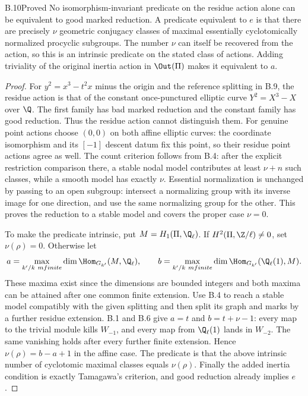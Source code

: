 \begin{claim}{B.10}{Proved}
No isomorphism-invariant predicate on the residue action alone can be
equivalent to good marked reduction. A predicate equivalent to $e$ is that
there are precisely $\nu$ geometric conjugacy classes of maximal
essentially cyclotomically normalized procyclic subgroups. The number $\nu$
can itself be recovered from the action, so this is an intrinsic predicate
on the stated class of actions. Adding triviality
of the original inertia action in $\Out(\Pi)$ makes it equivalent to $a$.
\end{claim}
\begin{proof}
For $y^2=x^3-t^2x$ minus the origin and the reference splitting in B.9,
the residue action is that of the constant once-punctured elliptic curve
$Y^2=X^3-X$ over $\Q$. The first family has bad marked reduction and the
constant family has good reduction. Thus the residue action cannot
distinguish them. For genuine point actions choose $(0,0)$ on both affine
elliptic curves: the coordinate isomorphism and its $[-1]$ descent datum
fix this point, so their residue point actions agree as well.
The count criterion follows from B.4: after the explicit restriction
comparison there, a stable nodal model contributes at least $\nu+n$ such
classes, while a smooth model has exactly $\nu$. Essential normalization
is unchanged by passing to an open subgroup: intersect a normalizing group
with its inverse image for one direction, and use the same normalizing
group for the other. This proves the reduction to a stable model and covers
the proper case $\nu=0$.

To make the predicate intrinsic, put $M=H_1(\Pi,\Q_\ell)$. If
$H^2(\Pi,\Z/\ell)\ne0$, set $\nu(\rho)=0$. Otherwise let
\[
 a=\max_{k'/k\ {
m finite}}\dim\Hom_{G_{k'}}(M,\Q_\ell),\qquad
 b=\max_{k'/k\ {
m finite}}\dim\Hom_{G_{k'}}(\Q_\ell(1),M).
\]
These maxima exist since the dimensions are bounded integers and both
maxima can be attained after one common finite extension. Use B.4 to reach
a stable model compatibly with the given splitting and then split its
graph and marks by a further residue extension. B.1 and B.6 give
$a=t$ and $b=t+\nu-1$: every map to the trivial module kills $W_{-1}$,
and every map from $\Q_\ell(1)$ lands in $W_{-2}$. The same vanishing
holds after every further finite extension. Hence
$\nu(\rho)=b-a+1$ in the affine case. The predicate is that the above
intrinsic number of cyclotomic maximal classes equals $\nu(\rho)$.
Finally the added inertia condition is exactly
Tamagawa's criterion, and good reduction already implies $e$.
\end{proof}

